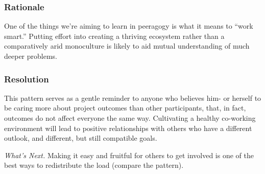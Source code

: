 \subsubsection*{Rationale}  One of the things we're aiming to learn in
peeragogy is what it means to ``work smart.''  Putting effort into creating
a thriving ecosystem rather than a comparatively arid monoculture is likely to
aid mutual understanding of much deeper problems.

\subsubsection*{Resolution}
This pattern serves as a gentle reminder to anyone who believes him- or
herself to be caring more about project outcomes than other
participants, that, in fact, outcomes do not affect everyone the same way.
Cultivating a healthy co-working environment will lead to positive relationships
with others who have a different outlook, and different, but still compatible goals.

\begin{framed}
\emph{What's Next.}
Making it easy
and fruitful for others to get involved is one of the best ways to
redistribute the load (compare the  pattern).
\end{framed}
